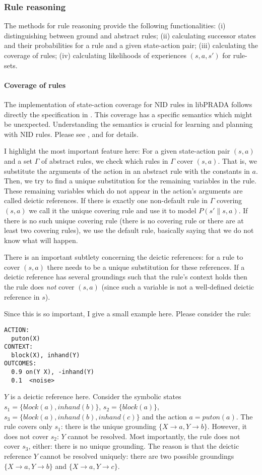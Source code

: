 \documentclass[10pt,twoside,twocolumn,fleqn]{article}
\begin{document}
\subsubsection{Rule reasoning}

The methods for rule reasoning provide the following functionalities: (i)
distinguishing between ground and abstract rules; (ii) calculating
successor states and their probabilities for a rule and a given
state-action pair; (iii) calculating the coverage of rules; (iv)
calculating likelihoods of experiences $(s,a,s')$ for rule-sets.

\paragraph{Coverage of rules}

The implementation of state-action coverage for NID rules in libPRADA
follows directly the specification in \citet{pasula07ai}. This coverage has
a specific semantics which might be unexpected. Understanding the
semantics is crucial for learning and planning with NID rules. Please see
\citet{pasula07ai}, \citet{lang-toussaint-10jair} and \citet{11-lang-phd}
for details.

I highlight the most important feature here: For a given state-action pair
$(s,a)$ and a set $\Gamma$ of abstract rules, we check which rules in
$\Gamma$ cover $(s,a)$. That is, we substitute the arguments of the
action in an abstract rule with the constants in $a$. Then, we try
to find a unique substitution for the remaining variables in the rule.
These remaining variables which do not
appear in the action's arguments are called deictic references. If there is
exactly one non-default rule in $\Gamma$ covering $(s,a)$ we call it the
unique covering rule and use it to model $P(s'\|s,a)$. If there is no such
unique covering rule (there is no covering rule or there are at least two
covering rules), we use the default rule, basically saying that we do not
know what will happen.

There is an important subtlety concerning the deictic references: for a
rule to cover $(s,a)$ there needs to be a unique substitution for these
references. If a deictic reference has several groundings such that the
rule's context holds then the rule does \emph{not} cover $(s,a)$
(since such a variable is not a well-defined deictic reference in $s$).

Since this is so important, I give a small example here. Please consider
the rule:
\begin{lstlisting}
ACTION:
  puton(X)
CONTEXT:
  block(X), inhand(Y)
OUTCOMES:
  0.9 on(Y X), -inhand(Y)
  0.1  <noise>
\end{lstlisting}
$Y$ is a deictic reference here. Consider the symbolic states $s_1 =
\{block(a), inhand(b)\}$, $s_2 = \{block(a)\}$, $s_3 = \{block(a),
inhand(b), inhand(c)\}$ and the action $a = puton(a)$. The rule covers only
$s_1$: there is the unique
grounding $\{X \to a, Y \to b\}$. However, it does not cover $s_2$: $Y$
cannot be resolved. Most importantly, the rule does not cover $s_3$,
either: there is no unique grounding. The reason is that the deictic
reference $Y$ cannot be resolved uniquely: there are two possible
groundings $\{X \to a, Y \to b\}$ and $\{X \to a, Y \to c\}$.
\end{document}
